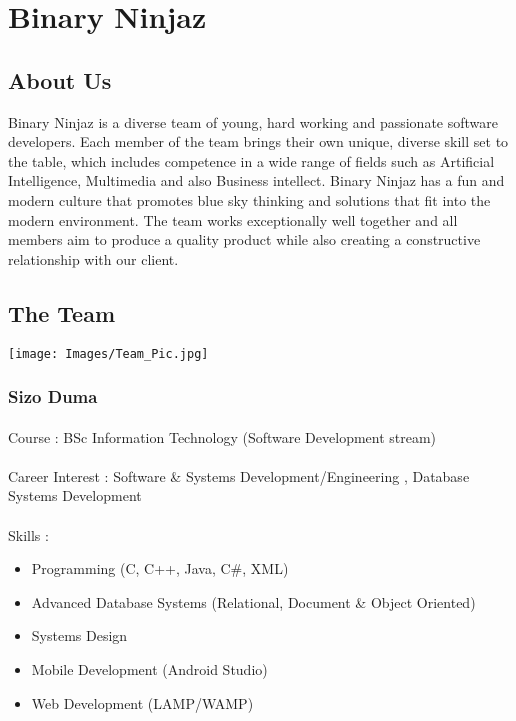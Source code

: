 \documentclass[11pt]{article}
\begin{document}
\newpage
\tableofcontents
\newpage

\section{Binary Ninjaz}
\subsection{About Us}
Binary Ninjaz is a diverse team of young, hard working and passionate software developers. Each member of the team brings their own unique, diverse skill set to the table, which includes competence in a wide range of fields such as Artificial Intelligence, Multimedia and also Business intellect. Binary Ninjaz has a fun and modern culture that promotes blue sky thinking and solutions that fit into the modern environment. The team works exceptionally well together and all members aim to produce a quality product while also creating a constructive relationship with our client.


\subsection{The Team}
\texttt{[image: Images/Team\_Pic.jpg]}

\hfill \break

\subsubsection{Sizo Duma} 
\paragraph{}Course : BSc Information Technology (Software Development stream)
\paragraph{}Career Interest : Software & Systems Development/Engineering , Database Systems Development
\paragraph{}Skills : 
\begin{itemize}
\item Programming (C, C++, Java, C\#, XML)
\item Advanced Database Systems (Relational, Document \& Object Oriented)
\item Systems Design
\item Mobile Development (Android Studio)
\item Web Development (LAMP/WAMP)
\end{itemize}
\end{document}
